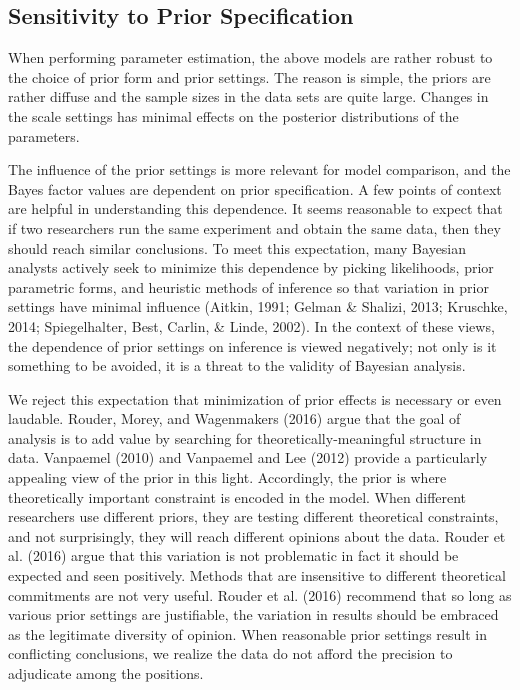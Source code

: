 \documentclass[english,man]{apa6}
\theoremstyle{definition}
\theoremstyle{definition}
\theoremstyle{definition}
\theoremstyle{remark}
\begin{document}
\subsection{Sensitivity to Prior
Specification}\label{sensitivity-to-prior-specification}

When performing parameter estimation, the above models are rather robust
to the choice of prior form and prior settings. The reason is simple,
the priors are rather diffuse and the sample sizes in the data sets are
quite large. Changes in the scale settings has minimal effects on the
posterior distributions of the parameters.

The influence of the prior settings is more relevant for model
comparison, and the Bayes factor values are dependent on prior
specification. A few points of context are helpful in understanding this
dependence. It seems reasonable to expect that if two researchers run
the same experiment and obtain the same data, then they should reach
similar conclusions. To meet this expectation, many Bayesian analysts
actively seek to minimize this dependence by picking likelihoods, prior
parametric forms, and heuristic methods of inference so that variation
in prior settings have minimal influence (Aitkin, 1991; Gelman \&
Shalizi, 2013; Kruschke, 2014; Spiegelhalter, Best, Carlin, \& Linde,
2002). In the context of these views, the dependence of prior settings
on inference is viewed negatively; not only is it something to be
avoided, it is a threat to the validity of Bayesian analysis.

We reject this expectation that minimization of prior effects is
necessary or even laudable. Rouder, Morey, and Wagenmakers (2016) argue
that the goal of analysis is to add value by searching for
theoretically-meaningful structure in data. Vanpaemel (2010) and
Vanpaemel and Lee (2012) provide a particularly appealing view of the
prior in this light. Accordingly, the prior is where theoretically
important constraint is encoded in the model. When different researchers
use different priors, they are testing different theoretical
constraints, and not surprisingly, they will reach different opinions
about the data. Rouder et al. (2016) argue that this variation is not
problematic in fact it should be expected and seen positively. Methods
that are insensitive to different theoretical commitments are not very
useful. Rouder et al. (2016) recommend that so long as various prior
settings are justifiable, the variation in results should be embraced as
the legitimate diversity of opinion. When reasonable prior settings
result in conflicting conclusions, we realize the data do not afford the
precision to adjudicate among the positions.
\end{document}
